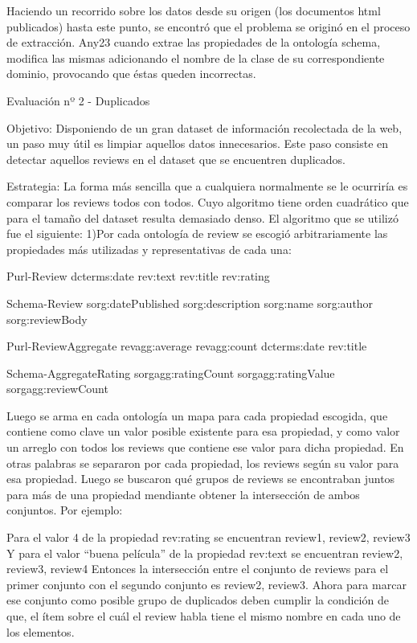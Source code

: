 Haciendo un recorrido sobre los datos desde su origen (los documentos html publicados) hasta este punto, se encontró que el problema se 
originó en el proceso de extracción. 
Any23 cuando extrae las propiedades de la ontología schema, modifica las mismas adicionando el nombre de la clase de su correspondiente dominio, provocando que éstas queden incorrectas.

Evaluación nº 2 - Duplicados

Objetivo:
Disponiendo de un gran dataset de información recolectada de la web, un paso muy útil es limpiar aquellos datos innecesarios. 
Este paso consiste en detectar aquellos reviews en el dataset que se encuentren duplicados.

Estrategia:
La forma más sencilla que a cualquiera normalmente se le ocurriría es comparar los reviews todos con todos. Cuyo algoritmo tiene orden cuadrático que para el tamaño del dataset resulta demasiado denso.
El algoritmo que se utilizó fue el siguiente:
1)Por cada ontología de review se escogió arbitrariamente las propiedades más utilizadas y representativas de cada una:

Purl-Review
dcterms:date
rev:text
rev:title
rev:rating

Schema-Review
sorg:datePublished
sorg:description
sorg:name
sorg:author
sorg:reviewBody

Purl-ReviewAggregate
revagg:average
revagg:count
dcterms:date
rev:title

Schema-AggregateRating
sorgagg:ratingCount
sorgagg:ratingValue
sorgagg:reviewCount

Luego se arma en cada ontología un mapa para cada propiedad escogida, que contiene como clave un valor posible existente para esa propiedad, y 
como valor un arreglo con todos los reviews que contiene ese valor para dicha propiedad.
En otras palabras se separaron por cada propiedad, los reviews según su valor para esa propiedad.
Luego se buscaron qué grupos de reviews se encontraban juntos para más de una propiedad mendiante obtener la intersección de ambos conjuntos. Por ejemplo:

Para el valor 4 de la propiedad rev:rating se encuentran {review1, review2, review3}
Y para el valor ``buena película'' de la propiedad rev:text se encuentran {review2, review3, review4}
Entonces la intersección entre el conjunto de reviews para el primer conjunto con el segundo conjunto es {review2, review3}.
Ahora para marcar ese conjunto como posible grupo de duplicados deben cumplir la condición de que, el ítem sobre el cuál el review habla
tiene el mismo nombre en cada uno de los elementos.

